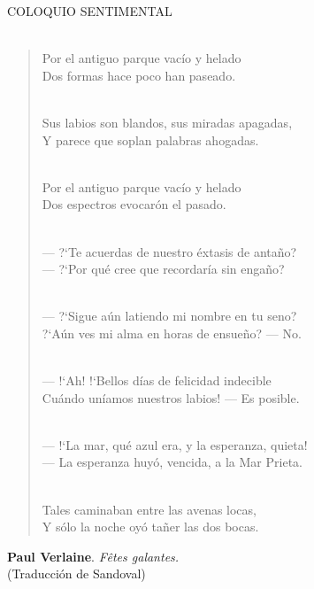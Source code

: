 \documentclass[a4paper,fullpage]{article}
\begin{document}
\thispagestyle{empty}
\advance \oddsidemargin 4cm

\vspace*{-10mm}
\hspace*{15mm} COLOQUIO SENTIMENTAL \\ \\

\begin{verse}
Por el antiguo parque vacío y helado \\
Dos formas hace poco han paseado. \\ \

Sus labios son blandos, sus miradas apagadas, \\
Y parece que soplan palabras ahogadas. \\ \

Por el antiguo parque vacío y helado \\
Dos espectros evocarón el pasado. \\ \

--- ?`Te acuerdas de nuestro éxtasis de anta\~no? \\
--- ?`Por qué cree que recordaría sin enga\~no? \\ \

--- ?`Sigue a\'un latiendo mi nombre en tu seno? \\
?`A\'un ves mi alma en horas de ensue\~no? --- No. \\ \

--- !`Ah! !`Bellos días de felicidad indecible \\
Cuándo uníamos nuestros labios! --- Es posible. \\ \

--- !`La mar, qué azul era, y la esperanza, quieta! \\
--- La esperanza huyó, vencida, a la Mar Prieta. \\ \

Tales caminaban entre las avenas locas, \\
Y sólo la noche oyó ta\~ner las dos bocas. \\ \vspace*{10mm}
\end{verse}

\noindent \hspace*{8mm} {\bf Paul Verlaine}. {\em Fêtes galantes.} \\
\noindent \hspace*{8mm} (Traducción de Sandoval)
\end{document}

